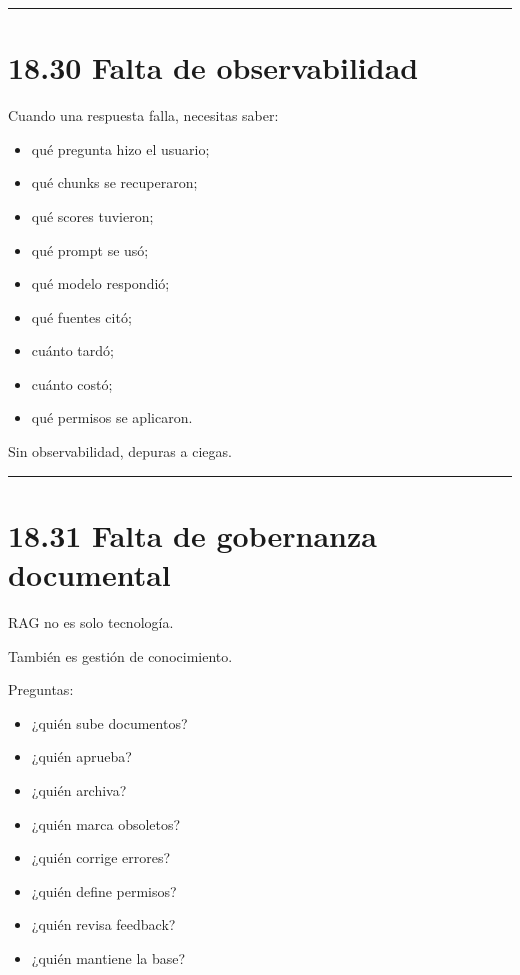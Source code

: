 \begin{center}\rule{0.5\linewidth}{0.5pt}\end{center}

\section{18.30 Falta de observabilidad}\label{falta-de-observabilidad}

Cuando una respuesta falla, necesitas saber:

\begin{itemize}
\tightlist
\item
  qué pregunta hizo el usuario;
\item
  qué chunks se recuperaron;
\item
  qué scores tuvieron;
\item
  qué prompt se usó;
\item
  qué modelo respondió;
\item
  qué fuentes citó;
\item
  cuánto tardó;
\item
  cuánto costó;
\item
  qué permisos se aplicaron.
\end{itemize}

Sin observabilidad, depuras a ciegas.

\begin{center}\rule{0.5\linewidth}{0.5pt}\end{center}

\section{18.31 Falta de gobernanza
documental}\label{falta-de-gobernanza-documental}

RAG no es solo tecnología.

También es gestión de conocimiento.

Preguntas:

\begin{itemize}
\tightlist
\item
  ¿quién sube documentos?
\item
  ¿quién aprueba?
\item
  ¿quién archiva?
\item
  ¿quién marca obsoletos?
\item
  ¿quién corrige errores?
\item
  ¿quién define permisos?
\item
  ¿quién revisa feedback?
\item
  ¿quién mantiene la base?
\end{itemize}

